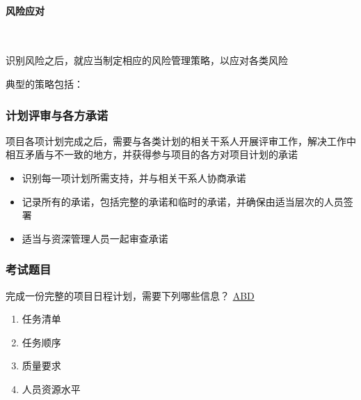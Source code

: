 \paragraph{风险应对}~{} \par
识别风险之后，就应当制定相应的风险管理策略，以应对各类风险

典型的策略包括：


\subsubsection{计划评审与各方承诺}
项目各项计划完成之后，需要与各类计划的相关干系人开展评审工作，解决工作中相互矛盾与不一致的地方，并获得参与项目的各方对项目计划的承诺
\begin{itemize}
    \item 识别每一项计划所需支持，并与相关干系人协商承诺
    \item 记录所有的承诺，包括完整的承诺和临时的承诺，并确保由适当层次的人员签署
    \item 适当与资深管理人员一起审查承诺
\end{itemize}

\subsubsection{考试题目}
\begin{problem}
	完成一份完整的项目日程计划，需要下列哪些信息？
	\uline{ABD}    
    \vspace{-0.8em}
    \begin{multicols}{4}
        \begin{enumerate}[label=\Alph*.]
            \item 任务清单
            \item 任务顺序
            \item 质量要求
            \item 人员资源水平
        \end{enumerate}
    \end{multicols}
    \vspace{-1em}
\end{problem}

